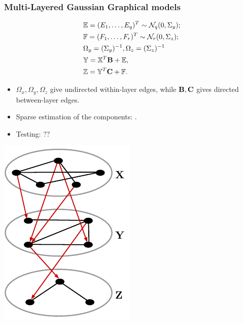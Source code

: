 \documentclass[10pt]{beamer}
\theoremstyle{definition}
\begin{document}
\begin{frame}
\frametitle{Multi-Layered Gaussian Graphical models}

\begin{minipage}{.49\textwidth}
%
{\color{black}
\begin{align*}
& {\mathbb{E}} = (E_1, \ldots, E_q)^T \sim {\cal{N}}_q (0, \Sigma_y);\\
& {\mathbb{F}} = (F_1, \ldots, F_r)^T \sim {\cal{N}}_r (0, \Sigma_z);\\
& \Omega_y = (\Sigma_y)^{-1}, \Omega_z = (\Sigma_z)^{-1}\\
& {\mathbb{Y}} = {\mathbb{X}}^T {\mathbf{B}} + {\mathbb{E}},\\
& {\mathbb{Z}} = {\mathbb{Y}}^T {\mathbf{C}} + {\mathbb{F}}.\\
\end{align*}}
%

\vspace{-3em}
\begin{itemize}
\item $\Omega_x, \Omega_y, \Omega_z$ give undirected within-layer edges, while ${\mathbf{B}}, {\mathbf{C}}$ gives directed between-layer edges.
\vspace{1em}

\item Sparse estimation of the components: {\colr\cite{LinEtal16}}.

\item Testing: {\colrbf ??}
\end{itemize}
\end{minipage}
%
\begin{minipage}{.49\textwidth}
\centering
\includegraphics[height=.7\textheight]{multilayer.pdf}
\end{minipage}

\end{frame}
\end{document}
